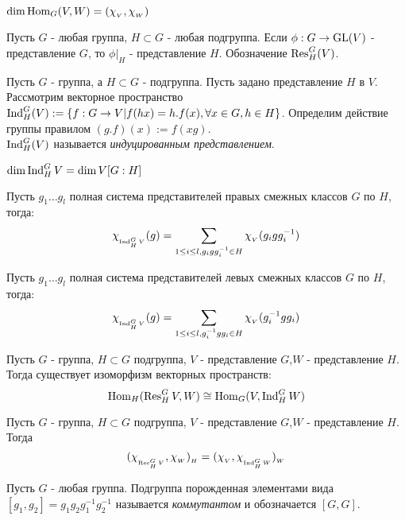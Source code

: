 \begin{ass}
$\dim\operatorname{Hom}_G(V,W)=(\chi_{_V},\chi_{_W})$
\end{ass}

\begin{ass}
Пусть $G$ - любая группа, $H\subset G$ - любая подгруппа. Если $\phi:G\to\operatorname{GL}(V)$ - представление $G$, то $\phi|_H$ - представление $H$. Обозначение $\operatorname{Res}_H^G(V)$.
\end{ass}

\begin{defi}
Пусть $G$ - группа, а $H\subset G$ - подгруппа. Пусть задано представление $H$ в $V$. Рассмотрим векторное пространство $\operatorname{Ind}_H^G(V):=\{f:G\to V|f(hx)=h.f(x),\forall x\in G,h\in H\}$. Определим действие группы правилом $(g.f)(x):=f(xg)$.\\
$\operatorname{Ind}_H^G(V)$ называется \textit{индуцированным представлением}.
\end{defi}

\begin{ass}
$\dim\operatorname{Ind}_H^GV = \dim V [G:H]$
\end{ass}

\begin{thm}
Пусть $g_1\ldots g_l$ полная система представителей правых смежных классов $G$ по $H$, тогда:
$$\chi_{_{\operatorname{Ind}_H^GV }}(g) = \sum_{1\leq i \leq l,g_igg_i^{-1}\in H}\chi_{_V}(g_igg_i^{-1})$$
\end{thm}

\begin{corol}
Пусть $g_1\ldots g_l$ полная система представителей левых смежных классов $G$ по $H$, тогда:
$$\chi_{_{\operatorname{Ind}_H^GV }}(g) = \sum_{1\leq i \leq l,g_i^{-1}gg_i\in H}\chi_{_V}(g_i^{-1}gg_i)$$
\end{corol}

\begin{thm}
Пусть $G$ - группа, $H\subset G$ подгруппа, $V$ - представление $G$,$W$ - представление $H$. Тогда существует изоморфизм векторных пространств:
$$\operatorname{Hom}_H(\operatorname{Res}_H^GV,W)\cong\operatorname{Hom}_G(V,\operatorname{Ind}_H^GW)$$
\end{thm}

\begin{corol}
Пусть $G$ - группа, $H\subset G$ подгруппа, $V$ - представление $G$,$W$ - представление $H$. Тогда 
$$(\chi_{_{\operatorname{Res}_H^GV}},\chi_{_W})_{_H} = (\chi_{_V},\chi_{_{\operatorname{Ind}_H^GW}})_{_W}$$
\end{corol}

\begin{defi}
Пусть $G$ - любая группа. Подгруппа порожденная элементами вида $[g_1,g_2]=g_1g_2g_1^{-1}g_2^{-1}$ называется \textit{коммутантом} и обозначается $[G,G]$.
\end{defi}

